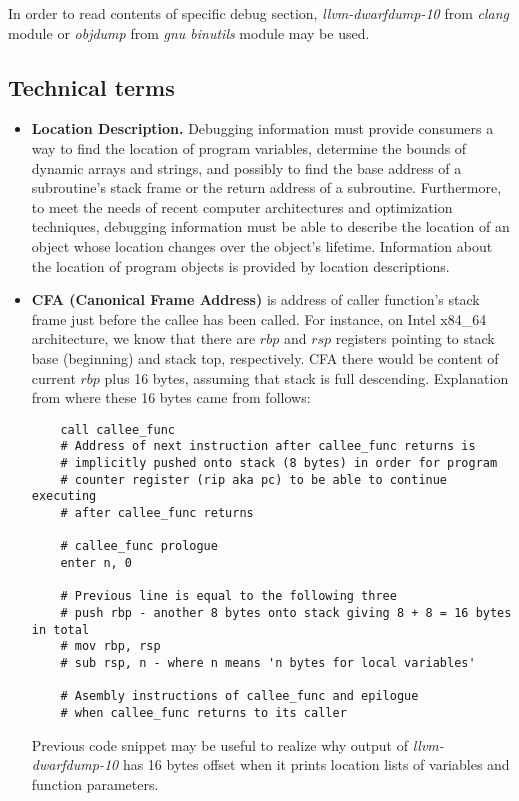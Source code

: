 \documentclass{report}
\begin{document}
	In order to read contents of specific debug section, \textit{llvm-dwarfdump-10} from \textit{clang} module or \textit{objdump} from \textit{gnu binutils} module may be used.

\subsection *{Technical terms}
\begin{itemize}
	\item \textbf{Location Description.} Debugging information must provide consumers a way to find the location of program
	variables, determine the bounds of dynamic arrays and strings, and possibly to find the
	base address of a subroutine’s stack frame or the return address of a subroutine.
	Furthermore, to meet the needs of recent computer architectures and optimization
	techniques, debugging information must be able to describe the location of an object
	whose location changes over the object’s lifetime. Information about the location of program objects is provided by location descriptions.
	\item \textbf{CFA (Canonical Frame Address)} is address of caller function's stack frame just before the callee has been called.
	For instance, on Intel x84\_64 architecture, we know that there are $rbp$ and $rsp$ registers pointing to stack base (beginning) and stack top, respectively.
	CFA there would be content of current $rbp$ plus 16 bytes, assuming that stack is full descending. Explanation from where these 16 bytes came from follows:
	\begin{verbatim}
	call callee_func
	# Address of next instruction after callee_func returns is
	# implicitly pushed onto stack (8 bytes) in order for program
	# counter register (rip aka pc) to be able to continue executing
	# after callee_func returns
	
	# callee_func prologue
	enter n, 0
	
	# Previous line is equal to the following three
	# push rbp - another 8 bytes onto stack giving 8 + 8 = 16 bytes in total
	# mov rbp, rsp
	# sub rsp, n - where n means 'n bytes for local variables'
	 		   
	# Asembly instructions of callee_func and epilogue 
	# when callee_func returns to its caller
	\end{verbatim}
	Previous code snippet may be useful to realize why output of \textit{llvm-dwarfdump-10} has 16 bytes offset when it prints location lists of variables and function parameters. 
	
\end{itemize}
\end{document}
